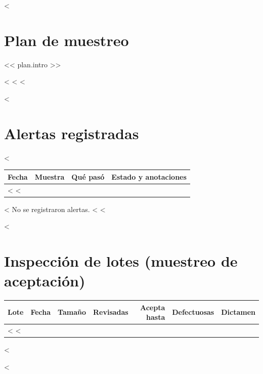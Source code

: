 \documentclass[11pt,a4paper]{article}
\begin{document}
\begin{itemize}
<%
\section*{Plan de muestreo}
<< plan.intro >>
\begin{itemize}
<%
<%
<%

<%
\section*{Alertas registradas}
<%
\begin{longtable}{@{}>{\raggedright\arraybackslash}p{2.3cm} l >{\raggedright\arraybackslash}p{6.0cm} >{\raggedright\arraybackslash}p{4.4cm}@{}}
\toprule
\textbf{Fecha} & \textbf{Muestra} & \textbf{Qué pasó} & \textbf{Estado y anotaciones} \\
\midrule
\endhead
<%
<%
\end{longtable}
<%
No se registraron alertas.
<%
<%

<%
\section*{Inspección de lotes (muestreo de aceptación)}
\begin{longtable}{@{}l l r r r r l@{}}
\toprule
\textbf{Lote} & \textbf{Fecha} & \textbf{Tamaño} & \textbf{Revisadas} & \textbf{Acepta hasta} & \textbf{Defectuosas} & \textbf{Dictamen} \\
\midrule
\endhead
<%
<%
\end{longtable}
<%

<%

\end{itemize}
\end{itemize}
\end{document}
